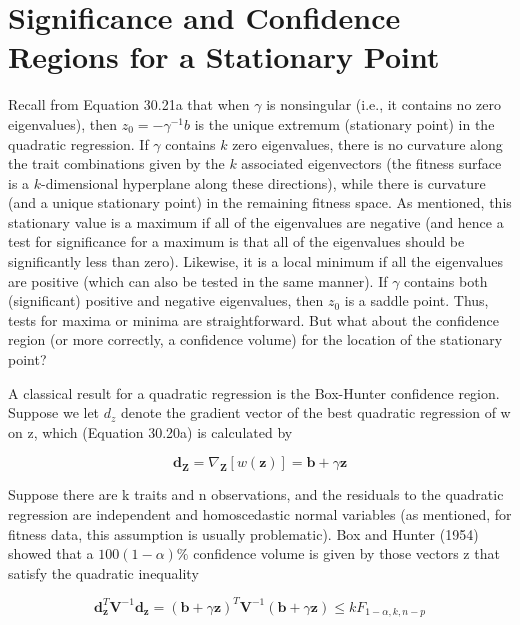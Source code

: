 \documentclass{article}
\begin{document}
\section{Significance and Confidence Regions for a Stationary Point}
Recall from Equation 30.21a that when  $ \gamma $ is nonsingular (i.e., it contains no zero eigenvalues), then  $ z_0 = -\gamma^{-1}b $ is the unique extremum (stationary point) in the quadratic regression. If  $ \gamma $ contains  $ k $ zero eigenvalues, there is no curvature along the trait combinations given by the  $ k $ associated eigenvectors (the fitness surface is a  $ k $-dimensional hyperplane along these directions), while there is curvature (and a unique stationary point) in the remaining fitness space. As mentioned, this stationary value is a maximum if all of the eigenvalues are negative (and hence a test for significance for a maximum is that all of the eigenvalues should be significantly less than zero). Likewise, it is a local minimum if all the eigenvalues are positive (which can also be tested in the same manner). If  $ \gamma $ contains both (significant) positive and negative eigenvalues, then  $ z_0 $ is a saddle point. Thus, tests for maxima or minima are straightforward. But what about the confidence region (or more correctly, a confidence volume) for the location of the stationary point?

A classical result for a quadratic regression is the Box-Hunter confidence region. Suppose we let  $ d_z $ denote the gradient vector of the best quadratic regression of w on z, which (Equation 30.20a) is calculated by

\begin{equation}
\mathbf{d}_{\mathbf{Z}}=\nabla_{\mathbf{Z}}[w(\mathbf{z})]=\mathbf{b}+\gamma\mathbf{z}
\end{equation}

Suppose there are k traits and n observations, and the residuals to the quadratic regression are independent and homoscedastic normal variables (as mentioned, for fitness data, this assumption is usually problematic). Box and Hunter (1954) showed that a  $ 100(1 - \alpha)\% $ confidence volume is given by those vectors z that satisfy the quadratic inequality

\begin{equation}
\mathbf{d}_{\mathbf{z}}^{T}\mathbf{V}^{-1}\mathbf{d}_{\mathbf{z}}=\left(\mathbf{b}+\gamma\mathbf{z}\right)^{T}\mathbf{V}^{-1}\left(\mathbf{b}+\gamma\mathbf{z}\right)\leq k F_{1-\alpha,k,n-p}
\tag{30.28}
\label{eq:30_28}
\end{equation}
\end{document}
